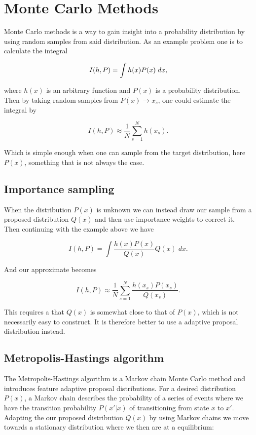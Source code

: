\section{Monte Carlo Methods}
Monte Carlo methods is a way to gain insight into a probability distribution by using random samples from said distribution. As an example problem one is to calculate the integral

$$I(h, P) = \int h(x) P(x) \; dx \space ,$$

where $h(x)$ is an arbitrary function and $P(x)$ is a probability distribution. Then by taking random samples from $P(x) \rightarrow x_s$, one could estimate the integral by

$$I(h, P) \approx \frac{1}{N} \sum_{s=1}^N h(x_s) .$$

Which is simple enough when one can sample from the target distribution, here $P(x)$, something that is not always the case.

\subsection{Importance sampling}

When the distribution $P(x)$ is unknown we can instead draw our sample from a proposed distribution $Q(x)$ and then use importance weights to correct it. Then continuing with the example above we have

$$I(h, P) = \int \frac{h(x)P(x)}{Q(x)}Q(x) \; dx .$$

And our approximate becomes

$$I(h, P) \approx \frac{1}{N} \sum_{s=1}^N \frac{h(x_s)P(x_s)}{Q(x_s)}.$$

This requires a that $Q(x)$ is somewhat close to that of $P(x)$, which is not necessarily easy to construct. It is therefore better to use a adaptive proposal distribution instead.

\subsection{Metropolis-Hastings algorithm}

The Metropolis-Hastings algorithm is a Markov chain Monte Carlo method and introduces feature adaptive proposal distributions. For a desired distribution $P(x)$, a Markov chain describes the probability of a series of events where we have the transition probability $P(x' | x)$ of transitioning from state $x$ to $x'$. Adapting the our proposed distribution $Q(x)$ by using Markov chains we move towards a stationary distribution where we then are at a equilibrium:

